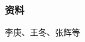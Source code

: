 \documentclass{beamer}
\begin{document}
\begin{CJK}{UTF8}{gbsn}
\begin{frame}
  \frametitle<presentation>{资料}
    
  \begin{thebibliography}{10}
    
  \beamertemplatearticlebibitems

    李庚、王冬、张辉等
  \end{thebibliography}

  \beamertemplate
\end{frame}



    
    

 
    


\clearpage
\end{CJK}
\end{document}
